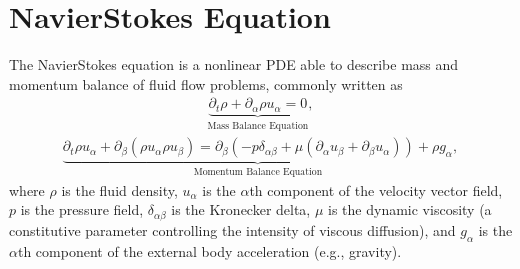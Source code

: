 \documentclass[letterpaper,10pt,english,openany,oneside]{jupyterBook}
\begin{document}
\chapter{Navier\sphinxhyphen{}Stokes Equation}
\label{\detokenize{Refs/LBM-Study/intro-nse-lbm/Navier-Stokes-Equation:navier-stokes-equation}}\label{\detokenize{Refs/LBM-Study/intro-nse-lbm/Navier-Stokes-Equation::doc}}
\sphinxAtStartPar
The Navier\sphinxhyphen{}Stokes equation is a non\sphinxhyphen{}linear PDE able to describe mass and momentum balance of fluid flow problems, commonly written as
\begin{equation*}
\begin{split}
\underbrace{\partial_t \rho + \partial_{\alpha}\rho u_{\alpha} = 0}_{\textrm{Mass Balance Equation}},
\end{split}
\end{equation*}\begin{equation}\label{equation:Refs/LBM-Study/intro-nse-lbm/Navier-Stokes-Equation:ns-eq-lb}
\begin{split}
\underbrace{\partial_t \rho u_{\alpha} + \partial_{\beta}\left(\rho u_{\alpha}\rho u_{\beta}\right) = \partial_{\beta}\left( -p \delta_{\alpha\beta} + \mu\left(\partial_{\alpha}u_{\beta}+\partial_{\beta}u_{\alpha}\right) \right) + \rho g_{\alpha}}_{\textrm{Momentum Balance Equation}} ,
\end{split}
\end{equation}
\sphinxAtStartPar
where \(\rho\) is the fluid density, \(u_{\alpha}\) is the \(\alpha\)\sphinxhyphen{}th component of the velocity vector field, \(p\) is the pressure field, \(\delta_{\alpha\beta}\) is the Kronecker delta, \(\mu\) is the dynamic viscosity (a constitutive parameter controlling the intensity of viscous diffusion), and \(g_{\alpha}\) is the \(\alpha\)\sphinxhyphen{}th component of the external body acceleration (e.g., gravity).
\end{document}

